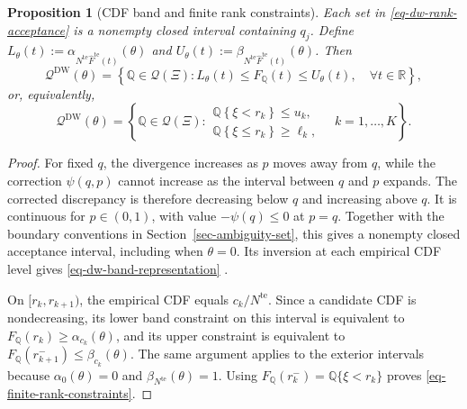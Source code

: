 \documentclass[review,11pt,3p,authoryear,nopreprintline]{elsarticle}
\newtheorem{proposition}{Proposition}
\begin{document}
\begin{proposition}[CDF band and finite rank constraints]
  \label{prop-finite-rank-constraints}
  Each set in \eqref{eq-dw-rank-acceptance} is a nonempty closed interval containing $q_j$. Define
  $L_\theta(t):=\alpha_{N^{\mathrm{te}}\widehat F^{\mathrm{te}}(t)}(\theta)$ and
  $U_\theta(t):=\beta_{N^{\mathrm{te}}\widehat F^{\mathrm{te}}(t)}(\theta)$.
  Then
  \begin{equation}
    \mathscr Q^{\mathrm{DW}}(\theta)
    =\left\{\mathbb Q\in\mathcal Q(\Xi):
    L_\theta(t)\le F_{\mathbb Q}(t)\le U_\theta(t),\quad\forall t\in\mathbb R\right\},
    \label{eq-dw-band-representation}
  \end{equation}
  or, equivalently,
  \begin{equation}
    \mathscr Q^{\mathrm{DW}}(\theta)
    =\left\{\mathbb Q\in\mathcal Q(\Xi):
    \begin{array}{l}
      \mathbb Q\left\{\xi<r_k\right\}\le u_k,\\
      \mathbb Q\left\{\xi\le r_k\right\}\ge\ell_k,
    \end{array}
    \quad k=1,\ldots,K\right\}.
    \label{eq-finite-rank-constraints}
  \end{equation}
\end{proposition}
\begin{proof}
  For fixed $q$, the divergence increases as $p$ moves away from $q$, while the correction $\psi(q,p)$ cannot increase as the interval between $q$ and $p$ expands. The corrected discrepancy is therefore decreasing below $q$ and increasing above $q$. It is continuous for $p\in(0,1)$, with value $-\psi(q)\le0$ at $p=q$. Together with the boundary conventions in Section~\ref{sec-ambiguity-set}, this gives a nonempty closed acceptance interval, including when $\theta=0$. Its inversion at each empirical CDF level gives \eqref{eq-dw-band-representation} \citep[Supplement, Section~S.6]{L.J23}.

  On $[r_k,r_{k+1})$, the empirical CDF equals $c_k/N^{\mathrm{te}}$. Since a candidate CDF is nondecreasing, its lower band constraint on this interval is equivalent to
  $F_{\mathbb Q}(r_k)\ge\alpha_{c_k}(\theta)$, and its upper constraint is equivalent to
  $F_{\mathbb Q}(r_{k+1}^-)\le\beta_{c_k}(\theta)$.
  The same argument applies to the exterior intervals because $\alpha_0(\theta)=0$ and $\beta_{N^{\mathrm{te}}}(\theta)=1$. Using
  $F_{\mathbb Q}(r_k^-)=\mathbb Q\{\xi<r_k\}$ proves \eqref{eq-finite-rank-constraints}.
\end{proof}
\end{document}
